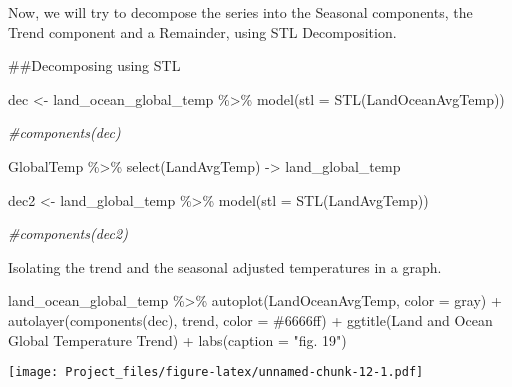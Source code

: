 \documentclass[
]{article}
\newenvironment{Shaded}{\begin{snugshade}}{\end{snugshade}}
\newcommand{\AttributeTok}[1]{\textcolor[rgb]{0.77,0.63,0.00}{#1}}
\newcommand{\CommentTok}[1]{\textcolor[rgb]{0.56,0.35,0.01}{\textit{#1}}}
\newcommand{\FunctionTok}[1]{\textcolor[rgb]{0.00,0.00,0.00}{#1}}
\newcommand{\NormalTok}[1]{#1}
\newcommand{\OtherTok}[1]{\textcolor[rgb]{0.56,0.35,0.01}{#1}}
\newcommand{\SpecialCharTok}[1]{\textcolor[rgb]{0.00,0.00,0.00}{#1}}
\newcommand{\StringTok}[1]{\textcolor[rgb]{0.31,0.60,0.02}{#1}}
\begin{document}
Now, we will try to decompose the series into the Seasonal components,
the Trend component and a Remainder, using STL Decomposition.

\#\#Decomposing using STL

\begin{Shaded}
\begin{Highlighting}[]
\NormalTok{dec }\OtherTok{\textless{}{-}}\NormalTok{ land\_ocean\_global\_temp }\SpecialCharTok{\%\textgreater{}\%} 
  \FunctionTok{model}\NormalTok{(}\AttributeTok{stl =} \FunctionTok{STL}\NormalTok{(LandOceanAvgTemp))}

\CommentTok{\#components(dec)}


\NormalTok{GlobalTemp }\SpecialCharTok{\%\textgreater{}\%}
  \FunctionTok{select}\NormalTok{(LandAvgTemp) }\OtherTok{{-}\textgreater{}}\NormalTok{ land\_global\_temp}

  
\NormalTok{dec2 }\OtherTok{\textless{}{-}}\NormalTok{ land\_global\_temp }\SpecialCharTok{\%\textgreater{}\%} 
  \FunctionTok{model}\NormalTok{(}\AttributeTok{stl =} \FunctionTok{STL}\NormalTok{(LandAvgTemp))}

\CommentTok{\#components(dec2)}
\end{Highlighting}
\end{Shaded}

Isolating the trend and the seasonal adjusted temperatures in a graph.

\begin{Shaded}
\begin{Highlighting}[]
\NormalTok{land\_ocean\_global\_temp }\SpecialCharTok{\%\textgreater{}\%}
  \FunctionTok{autoplot}\NormalTok{(LandOceanAvgTemp, }\AttributeTok{color =} \StringTok{\textquotesingle{}gray\textquotesingle{}}\NormalTok{) }\SpecialCharTok{+} 
  \FunctionTok{autolayer}\NormalTok{(}\FunctionTok{components}\NormalTok{(dec), trend, }\AttributeTok{color =} \StringTok{\textquotesingle{}\#6666ff\textquotesingle{}}\NormalTok{) }\SpecialCharTok{+} 
  \FunctionTok{ggtitle}\NormalTok{(}\StringTok{\textquotesingle{}Land and Ocean Global Temperature Trend\textquotesingle{}}\NormalTok{) }\SpecialCharTok{+}
  \FunctionTok{labs}\NormalTok{(}\AttributeTok{caption =} \StringTok{"fig. 19"}\NormalTok{)}
\end{Highlighting}
\end{Shaded}

\texttt{[image: Project\_files/figure-latex/unnamed-chunk-12-1.pdf]}
\end{document}

